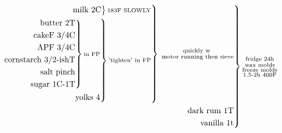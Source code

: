 \documentclass[12pt]{standalone}
\begin{document}
\[
\begin{rcases}\begin{alignedat}{3}
\begin{rcases}\begin{alignedat}{3}
\begin{rcases}\begin{alignedat}{3}
\text{milk 2C}\\
\end{alignedat}\end{rcases}
\substack{\text{183F SLOWLY}}\\
\begin{rcases}\begin{alignedat}{3}
\begin{rcases}\begin{alignedat}{3}
\text{butter 2T}\\
\text{cakeF 3/4C}\\
\text{APF 3/4C}\\
\text{cornstarch 3/2-ishT}\\
\text{salt pinch}\\
\text{sugar 1C-1T}\\
\end{alignedat}\end{rcases}
\substack{\text{in FP}}\\
\text{yolks 4}\\
\end{alignedat}\end{rcases}
\substack{\text{'tighten' in FP}}\\
\end{alignedat}\end{rcases}
\substack{\text{quickly w}\\\text{ motor running then sieve}}\\
\text{dark rum 1T}\\
\text{vanilla 1t}\\
\end{alignedat}\end{rcases}
\substack{\text{fridge 24h}\\\text{wax molds}\\\text{freeze molds}\\\text{1.5-2h 400F}}\\
\]
\end{document}
